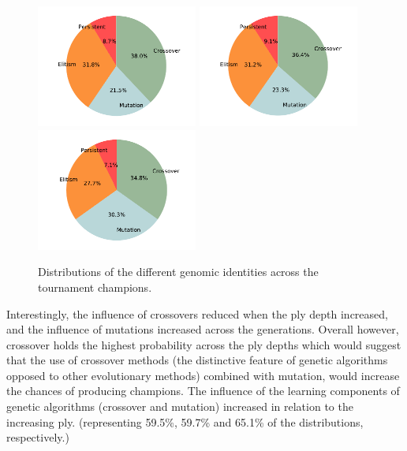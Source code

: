\documentclass[12pt,a4paper]{article}
\begin{document}
        \begin{figure}[!ht]
            \centering
            \includegraphics[width=53mm]{images/results/1ply/champ_gen_dist.pdf}
            \includegraphics[width=53mm]{images/results/3ply/champ_gen_dist.pdf}
            \includegraphics[width=53mm]{images/results/6ply/champ_gen_dist.pdf}
            \caption{Distributions of the different genomic identities across the tournament champions. \label{champ_gen_dist}}
        \end{figure}

        Interestingly, the influence of crossovers reduced when the ply depth increased, and the influence of mutations increased across the generations. Overall however, crossover holds the highest probability across the ply depths which would suggest that the use of crossover methods (the distinctive feature of genetic algorithms opposed to other evolutionary methods) combined with mutation, would increase the chances of producing champions. The influence of the learning components of genetic algorithms (crossover and mutation) increased in relation to the increasing ply. (representing 59.5\%, 59.7\% and 65.1\% of the distributions, respectively.)
\end{document}
